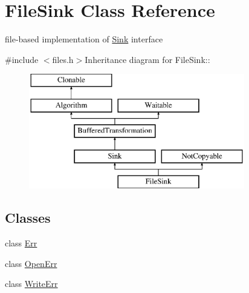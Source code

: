 \hypertarget{class_file_sink}{
\section{FileSink Class Reference}
\label{class_file_sink}
}


file-\/based implementation of \hyperlink{class_sink}{Sink} interface  


{\ttfamily \#include $<$files.h$>$}Inheritance diagram for FileSink::\begin{figure}[H]
\begin{center}
\leavevmode
\includegraphics[height=5cm]{class_file_sink}
\end{center}
\end{figure}
\subsection*{Classes}
\begin{DoxyCompactItemize}
\item 
class \hyperlink{class_file_sink_1_1_err}{Err}
\item 
class \hyperlink{class_file_sink_1_1_open_err}{OpenErr}
\item 
class \hyperlink{class_file_sink_1_1_write_err}{WriteErr}
\end{DoxyCompactItemize}
